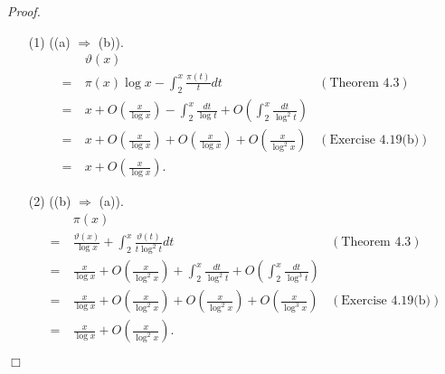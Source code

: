\documentclass{article}
\begin{document}
\emph{Proof.}
\begin{enumerate}
\item[(1)]
  ((a) $\Longrightarrow$ (b)).
  \begin{align*}
    & \: \vartheta(x) \\
    =& \: \pi(x) \log x - \int_{2}^{x} \frac{\pi(t)}{t} dt
      &(\text{Theorem 4.3}) \\
    =& \: x + O\left( \frac{x}{\log x} \right)
        - \int_{2}^{x} \frac{dt}{\log t}
        + O\left(\int_{2}^{x} \frac{dt}{\log^2 t} \right) \\
    =& \: x + O\left( \frac{x}{\log x} \right)
        + O\left( \frac{x}{\log x} \right)
        + O\left( \frac{x}{\log^2 x} \right)
      &(\text{Exercise 4.19(b)}) \\
    =& \: x + O\left( \frac{x}{\log x} \right).
  \end{align*}

\item[(2)]
  ((b) $\Longrightarrow$ (a)).
  \begin{align*}
    & \: \pi(x) \\
    =& \: \frac{\vartheta(x)}{\log x} + \int_{2}^{x} \frac{\vartheta(t)}{t \log^2 t} dt
      &(\text{Theorem 4.3}) \\
    =& \: \frac{x}{\log x} + O\left( \frac{x}{\log^2 x} \right)
        + \int_{2}^{x} \frac{dt}{\log^2 t}
        + O\left(\int_{2}^{x} \frac{dt}{\log^3 t} \right) \\
    =& \: \frac{x}{\log x} + O\left( \frac{x}{\log^2 x} \right)
        + O\left( \frac{x}{\log^2 x} \right)
        + O\left( \frac{x}{\log^3 x} \right)
      &(\text{Exercise 4.19(b)}) \\
    =& \: \frac{x}{\log x} + O\left( \frac{x}{\log^2 x} \right).
  \end{align*}

\end{enumerate}
$\Box$ \\\\



\end{document}
